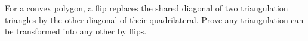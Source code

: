 For a convex polygon, a flip replaces the shared diagonal of two triangulation triangles by the other diagonal of their quadrilateral. Prove any triangulation can be transformed into any other by flips.
